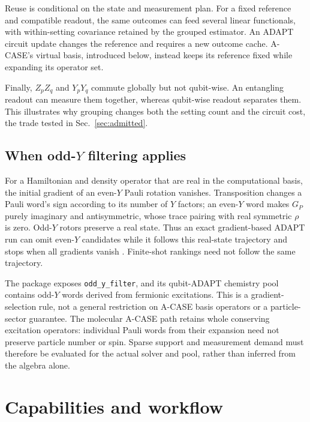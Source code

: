 \documentclass[aps,pra,reprint,superscriptaddress,nofootinbib,floatfix,
  showkeys]{revtex4-2}
\begin{document}
Reuse is conditional on the state and measurement plan. For a fixed
reference and compatible readout, the same outcomes can feed several
linear functionals, with within-setting covariance retained by the grouped
estimator. An ADAPT circuit update changes the reference and requires a new
outcome cache. A-CASE's virtual basis, introduced below, instead keeps its
reference fixed while expanding its operator set.

Finally, $Z_pZ_q$ and $Y_pY_q$ commute globally but not qubit-wise.
An entangling readout can measure them together, whereas qubit-wise
readout separates them. This illustrates why grouping changes both the
setting count and the circuit cost, the trade tested in
Sec.~\ref{sec:admitted}.

\subsection{When \texorpdfstring{odd-$Y$}{odd-Y} filtering applies}
\label{sec:operator-parity}

For a Hamiltonian and density operator that are real in the computational
basis, the initial gradient of an even-$Y$ Pauli rotation vanishes.
Transposition changes a Pauli word's sign according to its number of $Y$
factors; an even-$Y$ word makes $G_P$ purely imaginary and antisymmetric,
whose trace pairing with real symmetric $\rho$ is zero. Odd-$Y$ rotors
preserve a real state. Thus an exact gradient-based ADAPT run can omit
even-$Y$ candidates while it follows this real-state trajectory and stops
when all gradients vanish \cite{utama2026operatorcentric}. Finite-shot
rankings need not follow the same trajectory.

The package exposes \texttt{odd\_y\_filter}, and its qubit-ADAPT chemistry
pool contains odd-$Y$ words derived from fermionic excitations. This is a
gradient-selection rule, not a general restriction on A-CASE basis
operators or a particle-sector guarantee. The molecular A-CASE path retains
whole conserving excitation operators: individual Pauli words from their
expansion need not preserve particle number or spin. Sparse support and
measurement demand must therefore be evaluated for the actual solver and
pool, rather than inferred from the algebra alone.

\section{Capabilities and workflow}
\label{sec:features}
\end{document}
